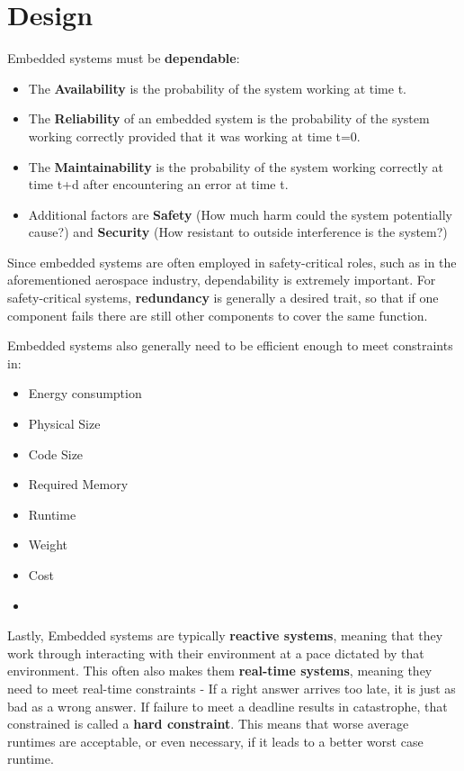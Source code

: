 \documentclass{report}
\newcommand{\tbf}{\textbf}
\newcommand*{\newpar}{\par\vspace{\baselineskip}\noindent} %
\begin{document}
\section{Design}
Embedded systems must be \tbf{dependable}:
\begin{itemize}
    \item The \tbf{Availability} is the probability of the system working at time t.
    \item The \tbf{Reliability} of an embedded system is the probability of the system working correctly provided that it was working at time t=0.
    \item The \tbf{Maintainability} is the probability of the system working correctly at time t+d after encountering an error at time t.
    \item Additional factors are \tbf{Safety} (How much harm could the system potentially cause?) and \tbf{Security} (How resistant to outside interference is the system?)
\end{itemize}
Since embedded systems are often employed in safety-critical roles, such as in the aforementioned aerospace industry, dependability is extremely important. For safety-critical systems, \tbf{redundancy} is generally a desired trait, so that if one component fails there are still other components to cover the same function.
\newpar
Embedded systems also generally need to be efficient enough to meet constraints in:
\begin{multicols}{2}
\begin{itemize}
    \item Energy consumption
    \item Physical Size
    \item Code Size
    \item Required Memory
    \item Runtime
    \item Weight
    \item Cost
    \item[\vspace{\fill}]
\end{itemize}
\end{multicols}
\newpar
Lastly, Embedded systems are typically \tbf{reactive systems}, meaning that they work through interacting with their environment at a pace dictated by that environment. This often also makes them \tbf{real-time systems}, meaning they need to meet real-time constraints - If a right answer arrives too late, it is just as bad as a wrong answer. If failure to meet a deadline results in catastrophe, that constrained is called a \tbf{hard constraint}. This means that worse average runtimes are acceptable, or even necessary, if it leads to a better worst case runtime. 
%
\end{document}
